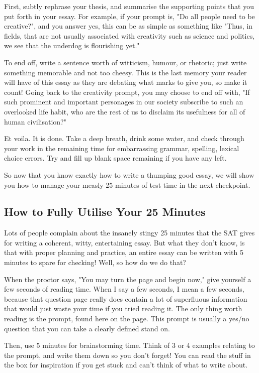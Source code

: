 \documentclass[DIV=calc,11pt,parskip,numbers=noenddot]{scrartcl} %
\begin{document}
First, subtly rephrase your thesis, and summarise the supporting points that you put forth in your essay. For example, if your prompt is, "Do all people need to be creative?", and you answer yes, this can be as simple as something like "Thus, in fields, that are not usually associated with creativity such as science and politics, we see that the underdog is flourishing yet."

To end off, write a sentence worth of witticism, humour, or rhetoric; just write something memorable and not too cheesy. This is the last memory your reader will have of this essay as they are debating what marks to give you, so make it count! Going back to the creativity prompt, you may choose to end off with, "If such prominent and important personages in our society subscribe to such an overlooked life habit, who are the rest of us to disclaim its usefulness for all of human civilisation?"

Et voila. It is done. Take a deep breath, drink some water, and check through your work in the remaining time for embarrassing grammar, spelling, lexical choice errors. Try and fill up blank space remaining if you have any left.

So now that you know exactly how to write a thumping good essay, we will show you how to manage your measly 25 minutes of test time in the next checkpoint.
\subsection{How to Fully Utilise Your 25 Minutes}
Lots of people complain about the insanely stingy 25 minutes that the SAT gives for writing a coherent, witty, entertaining essay. But what they don’t know, is that with proper planning and practice, an entire essay can be written with 5 minutes to spare for checking! Well, so how do we do that?

When the proctor says, "You may turn the page and begin now," give yourself a few seconds of reading time. When I say a few seconds, I mean a few seconds, because that question page really does contain a lot of superfluous information that would just waste your time if you tried reading it. The only thing worth reading is the prompt, found here on the page. This prompt is usually a yes/no question that you can take a clearly defined stand on. 

Then, use 5 minutes for brainstorming time. Think of 3 or 4 examples relating to the prompt, and write them down so you don’t forget! You can read the stuff in the box for inspiration if you get stuck and can’t think of what to write about. 
\end{document}
